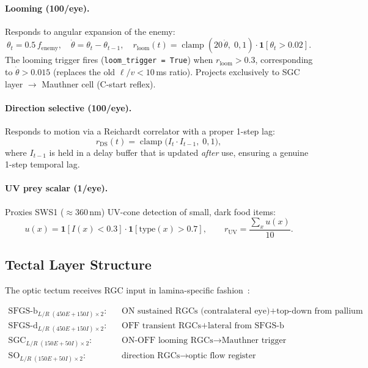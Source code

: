 \documentclass[11pt,a4paper]{article}
\begin{document}
\paragraph{Looming (100/eye).}
Responds to angular expansion of the enemy:
\begin{equation}\label{eq:loom}
  \theta_t = 0.5\,f_\text{enemy},
  \quad
  \dot\theta = \theta_t - \theta_{t-1},
  \quad
  r_\text{loom}(t) = \operatorname{clamp}(20\,\dot\theta,\;0,1)
    \cdot \mathbf{1}[\theta_t > 0.02].
\end{equation}
The looming trigger fires (\texttt{loom\_trigger = True}) when
$r_\text{loom} > 0.3$, corresponding to $\dot\theta > 0.015$
(replaces the old $\ell/v < 10$\,ms ratio).
Projects exclusively to SGC layer $\to$ Mauthner cell (C-start reflex).

\paragraph{Direction selective (100/eye).}
Responds to motion via a Reichardt correlator with a proper 1-step lag:
\begin{equation}\label{eq:ds}
  r_\text{DS}(t) = \operatorname{clamp}\!\bigl(I_t \cdot I_{t-1},\; 0, 1\bigr),
\end{equation}
where $I_{t-1}$ is held in a delay buffer that is updated \emph{after} use,
ensuring a genuine 1-step temporal lag.

\paragraph{UV prey scalar (1/eye).}
Proxies SWS1 (${\approx}360$\,nm) UV-cone detection of small, dark food items:
\begin{equation}\label{eq:uv_prey}
  u(x) = \mathbf{1}[I(x) < 0.3]\cdot\mathbf{1}[\text{type}(x) > 0.7],
  \qquad
  r_\text{UV} = \frac{\sum_x u(x)}{10}.
\end{equation}

\subsection{Tectal Layer Structure}

The optic tectum receives RGC input in lamina-specific fashion~\cite{robles2014}:

\begin{equation}\label{eq:tectal_layers}
\begin{aligned}
  \text{SFGS-b}_{L/R\;(450E+150I)\times 2}: &\quad \text{ON sustained RGCs (contralateral eye)} + \text{top-down from pallium} \\
  \text{SFGS-d}_{L/R\;(450E+150I)\times 2}: &\quad \text{OFF transient RGCs} + \text{lateral from SFGS-b} \\
  \text{SGC}_{L/R\;(150E+50I)\times 2}:     &\quad \text{ON-OFF looming RGCs} \to \text{Mauthner trigger} \\
  \text{SO}_{L/R\;(150E+50I)\times 2}:      &\quad \text{direction RGCs} \to \text{optic flow register}
\end{aligned}
\end{equation}
\end{document}

